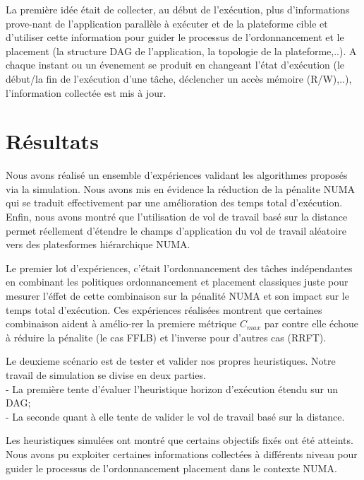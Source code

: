 La première idée était de collecter, au début de l'exécution, plus d'informations prove-nant de l’application parallèle à exécuter et de la plateforme cible et d'utiliser cette information pour guider le processus de l'ordonnancement et le placement (la structure DAG de l'application, la topologie de la plateforme,..). A chaque instant ou un évenement se produit en changeant l'état d'exécution (le début/la fin de l'exécution d'une tâche, déclencher un accès mémoire (R/W),..), l'information collectée est mis à jour.   
%
\section{Résultats}
%
Nous avons réalisé un ensemble d’expériences validant les algorithmes proposés via la simulation. 
Nous avons mis en évidence la réduction de la pénalite NUMA qui se traduit effectivement par une amélioration des temps total d'exécution. 
Enfin, nous avons montré que l’utilisation de vol de travail basé sur la distance permet réellement d’étendre le champs d’application du vol de
travail aléatoire vers des platesformes hiérarchique NUMA.

Le premier lot d'expériences, c'était l'ordonnancement des tâches indépendantes en combinant les politiques ordonnancement et placement classiques juste pour mesurer l'éffet de cette combinaison sur la pénalité NUMA et son impact sur le temps total d'exécution.
Ces expériences réalisées montrent que certaines combinaison aident à amélio-rer la premiere métrique $C_{max}$ par contre elle échoue à réduire la pénalite (le cas FFLB) et l'inverse pour d'autres cas (RRFT).

Le deuxieme scénario est de tester et valider nos propres heuristiques. Notre travail de simulation se divise en deux
parties. \\
- La première tente d'évaluer l'heuristique horizon d'exécution étendu sur un DAG; \\
- La seconde quant à elle tente de valider le vol de travail basé sur la distance. 

Les heuristiques simulées ont montré que certains objectifs fixés ont été atteints. Nous avons pu exploiter certaines informations collectées à différents niveau pour guider le processus de l'ordonnancement placement dans le contexte NUMA.  

